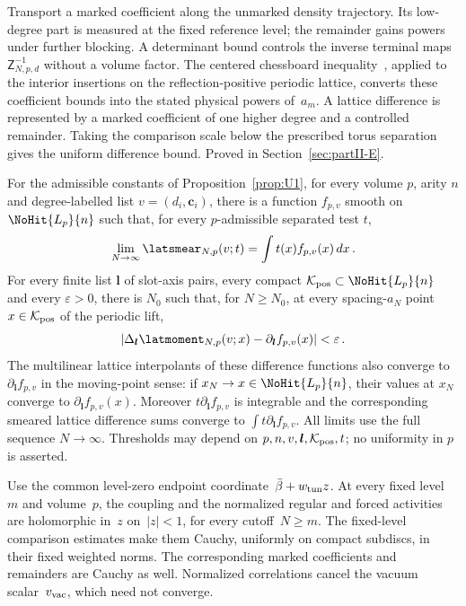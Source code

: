 Transport a marked coefficient along the unmarked density trajectory.
Its low-degree part is measured at the fixed reference level; the remainder
gains powers under further blocking. A determinant bound controls the
inverse terminal maps~$\mathsf Z_{N,p,d}^{-1}$ without a volume factor. The centered chessboard
inequality~\cite[Theorem~4.1]{FrohlichIsraelLiebSimon1978}, applied to the interior insertions on the reflection-positive periodic lattice, converts these coefficient bounds into the stated physical powers
of~$a_m$. A lattice difference is represented by a marked coefficient of one
higher degree and a controlled remainder. Taking the comparison scale below
the prescribed torus separation gives the uniform difference bound.
Proved in Section~\ref{sec:partII-E}.

\begin{proposition}\label{prop:U4}
For the admissible constants of Proposition~\ref{prop:U1}, for every volume $p$, arity $n$ and degree-labelled list $v=(d_i,\mathbf c_i)$, there is a function $f_{p,v}$ smooth on $\NoHit{L_p}{n}$ such that, for every $p$-admissible separated test $t$,
\begin{equation}\label{eq:U4-1}
\lim_{N\to\infty}\latsmear_{N,p}(v;t)=\int t(x)f_{p,v}(x)\,dx\,.
\end{equation}
For every finite list $\boldsymbol l$ of slot-axis pairs, every compact $\mathcal K_{\rm pos}\subset\NoHit{L_p}{n}$ and every $\varepsilon>0$, there is $N_0$ such that, for $N\ge N_0$, at every spacing-$a_N$ point $x\in\mathcal K_{\rm pos}$ of the periodic lift,
\begin{equation}\label{eq:U4-2}
|\Delta_{\boldsymbol l}\latmoment_{N,p}(v;x)-\partial_{\boldsymbol l}f_{p,v}(x)|<\varepsilon\,.
\end{equation}
The multilinear lattice interpolants of these difference functions also converge to $\partial_{\boldsymbol l}f_{p,v}$ in the moving-point sense: if $x_N\to x\in\NoHit{L_p}{n}$, their values at $x_N$ converge to $\partial_{\boldsymbol l}f_{p,v}(x)$. Moreover $t\partial_{\boldsymbol l}f_{p,v}$ is integrable and the corresponding smeared lattice difference sums converge to $\int t\partial_{\boldsymbol l}f_{p,v}$. All limits use the full sequence $N\to\infty$. Thresholds may depend on $p,n,v,\boldsymbol l,\mathcal K_{\rm pos},t$; no uniformity in $p$ is asserted.
\end{proposition}

Use the common level-zero endpoint coordinate~$\bar\beta+w_{\rm tun}z$. At every fixed level~$m$ and volume~$p$, the coupling and the normalized regular and forced activities are holomorphic in~$z$ on~$|z|<1$, for every cutoff~$N\ge m$. The fixed-level comparison estimates make them Cauchy, uniformly on compact subdiscs, in their fixed weighted norms. The corresponding marked coefficients and remainders are Cauchy as well. Normalized correlations cancel the vacuum scalar~$v_{\rm vac}$, which need not converge.

